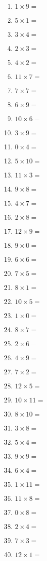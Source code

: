 \documentclass{article}
\begin{document}
\begin{multicols}{4}
\begin{enumerate}[label=\arabic*.,itemsep=0pt,parsep=0pt]
\item $1 \times 9 =$
\item $5 \times 1 =$
\item $3 \times 4 =$
\item $2 \times 3 =$
\item $4 \times 2 =$
\item $11 \times 7 =$
\item $7 \times 7 =$
\item $6 \times 9 =$
\item $10 \times 6 =$
\item $3 \times 9 =$
\item $0 \times 4 =$
\item $5 \times 10 =$
\item $11 \times 3 =$
\item $9 \times 8 =$
\item $4 \times 7 =$
\item $2 \times 8 =$
\item $12 \times 9 =$
\item $9 \times 0 =$
\item $6 \times 6 =$
\item $7 \times 5 =$
\item $8 \times 1 =$
\item $10 \times 5 =$
\item $1 \times 0 =$
\item $8 \times 7 =$
\item $2 \times 6 =$
\item $4 \times 9 =$
\item $7 \times 2 =$
\item $12 \times 5 =$
\item $10 \times 11 =$
\item $8 \times 10 =$
\item $3 \times 8 =$
\item $5 \times 4 =$
\item $9 \times 9 =$
\item $6 \times 4 =$
\item $1 \times 11 =$
\item $11 \times 8 =$
\item $0 \times 8 =$
\item $2 \times 4 =$
\item $7 \times 3 =$
\item $12 \times 1 =$

\end{enumerate}
\end{multicols}
\end{document}
